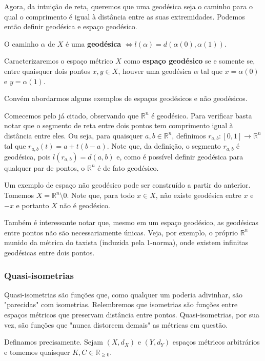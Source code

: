 Agora, da intuição de reta, queremos que uma geodésica seja o caminho para o qual o comprimento é igual à distância entre as suas extremidades. Podemos então definir geodésica e espaço geodésico.

\begin{definition}
O caminho $\alpha$ de $X$ é uma \textbf{geodésica} $\iff l(\alpha) = d(\alpha(0), \alpha(1))$.
\end{definition}
\begin{definition}
Caracterizaremos o espaço métrico $X$ como \textbf{espaço geodésico} se e somente se, entre quaisquer dois pontos $x, y \in X$, houver uma geodésica $\alpha$ tal que $x = \alpha(0)$ e $y = \alpha(1)$.
\label{esp_geo}
\end{definition}

Convém abordarmos alguns exemplos de espaços geodésicos e não geodésicos.

Comecemos pelo já citado, observando que $\mathbb{R}^n$ é geodésico. Para verificar basta notar que o segmento de reta entre dois pontos tem comprimento igual à distância entre eles. Ou seja, para quaisquer $a, b \in \mathbb{R}^n$, definimos $r_{a,b}:[0,1] \rightarrow \mathbb{R}^n$ tal que $r_{a,b}(t) = a + t(b-a)$. Note que, da definição, o segmento $r_{a,b}$ é geodésica, pois $l(r_{a,b}) = d(a, b)$ e, como é possível definir geodésica para qualquer par de pontos, o $\mathbb{R}^n$ é de fato geodésico.

Um exemplo de espaço não geodésico pode ser construído a partir do anterior. Tomemos $X = \mathbb{R}^n \setminus {0}$. Note que, para todo $x \in X$, não existe geodésica entre $x$ e $-x$ e portanto $X$ não é geodésico.

Também é interessante notar que, mesmo em um espaço geodésico, as geodésicas entre pontos não são necessariamente únicas. Veja, por exemplo, o próprio $\mathbb{R}^n$ munido da métrica do taxista (induzida pela 1-norma), onde existem infinitas geodésicas entre dois pontos.

\subsubsection{Quasi-isometrias}
Quasi-isometrias são funções que, como qualquer um poderia adivinhar, são "parecidas" com isometrias. Relembremos que isometrias são funções entre espaços métricos que preservam distância entre pontos. Quasi-isometrias, por sua vez, são funções que "nunca distorcem demais" as métricas em questão.

Definamos precisamente. Sejam $(X, d_X)$ e $(Y, d_Y)$ espaços métricos arbitrários e tomemos quaisquer $K, C \in \mathbb{R}_{\geq 0}$.

